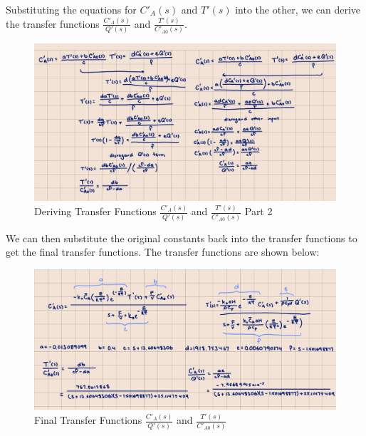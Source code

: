 \documentclass[12pt]{article}
\begin{document}
\begin{enumerate}
\begin{enumerate}
    \pagebreak

    Substituting the equations for $C'_A(s)$ and $T'(s)$ into the other, we can derive the transfer functions $\frac{C'_A(s)}{Q'(s)}$ and $\frac{T'(s)}{C'_{A0}(s)}$. 

    \begin{figure}[H]
      \centering
      \includegraphics[width=\textwidth]{Figures/handcalc/figure4-4c.png}
      \caption{Deriving Transfer Functions $\frac{C'_A(s)}{Q'(s)}$ and $\frac{T'(s)}{C'_{A0}(s)}$ Part 2}
      \label{fig:figure47}
    \end{figure}

    \pagebreak

    We can then substitute the original constants back into the transfer functions to get the final transfer functions. The transfer functions are shown below:

    \begin{figure}[H]
      \centering
      \includegraphics[width=\textwidth]{Figures/handcalc/figure4-4d.png}
      \caption{Final Transfer Functions $\frac{C'_A(s)}{Q'(s)}$ and $\frac{T'(s)}{C'_{A0}(s)}$}
      \label{fig:figure48}
    \end{figure}
    
    \pagebreak


\end{enumerate}
\end{enumerate}
\end{document}
